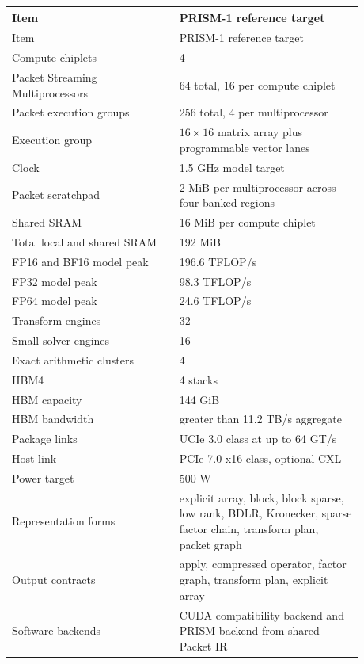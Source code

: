 \begin{longtable}{L{0.42\linewidth}L{0.46\linewidth}}
\toprule
Item & PRISM-1 reference target \\
\midrule
\endfirsthead
\toprule
Item & PRISM-1 reference target \\
\midrule
\endhead
Compute chiplets & 4 \\
Packet Streaming Multiprocessors & 64 total, 16 per compute chiplet \\
Packet execution groups & 256 total, 4 per multiprocessor \\
Execution group & $16\times16$ matrix array plus programmable vector lanes \\
Clock & 1.5 GHz model target \\
Packet scratchpad & 2 MiB per multiprocessor across four banked regions \\
Shared SRAM & 16 MiB per compute chiplet \\
Total local and shared SRAM & 192 MiB \\
FP16 and BF16 model peak & 196.6 TFLOP/s \\
FP32 model peak & 98.3 TFLOP/s \\
FP64 model peak & 24.6 TFLOP/s \\
Transform engines & 32 \\
Small-solver engines & 16 \\
Exact arithmetic clusters & 4 \\
HBM4 & 4 stacks \\
HBM capacity & 144 GiB \\
HBM bandwidth & greater than 11.2 TB/s aggregate \\
Package links & UCIe 3.0 class at up to 64 GT/s \\
Host link & PCIe 7.0 x16 class, optional CXL \\
Power target & 500 W \\
Representation forms & explicit array, block, block sparse, low rank, BDLR, Kronecker, sparse factor chain, transform plan, packet graph \\
Output contracts & apply, compressed operator, factor graph, transform plan, explicit array \\
Software backends & CUDA compatibility backend and PRISM backend from shared Packet IR \\
\bottomrule
\end{longtable}
